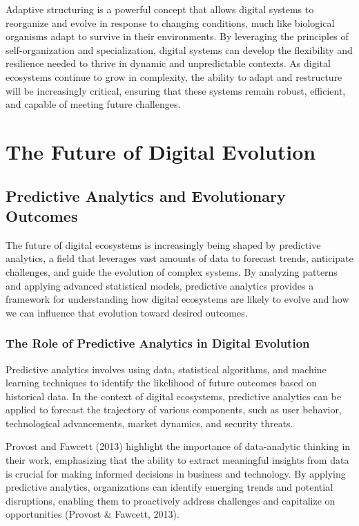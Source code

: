 \documentclass[12pt,twoside]{article}
\begin{document}
Adaptive structuring is a powerful concept that allows digital systems to reorganize and evolve in response to changing conditions, much like biological organisms adapt to survive in their environments. By leveraging the principles of self-organization and specialization, digital systems can develop the flexibility and resilience needed to thrive in dynamic and unpredictable contexts. As digital ecosystems continue to grow in complexity, the ability to adapt and restructure will be increasingly critical, ensuring that these systems remain robust, efficient, and capable of meeting future challenges.


\section{The Future of Digital Evolution}
\subsection{Predictive Analytics and Evolutionary Outcomes}
The future of digital ecosystems is increasingly being shaped by predictive analytics, a field that leverages vast amounts of data to forecast trends, anticipate challenges, and guide the evolution of complex systems. By analyzing patterns and applying advanced statistical models, predictive analytics provides a framework for understanding how digital ecosystems are likely to evolve and how we can influence that evolution toward desired outcomes.

\subsubsection{The Role of Predictive Analytics in Digital Evolution}

Predictive analytics involves using data, statistical algorithms, and machine learning techniques to identify the likelihood of future outcomes based on historical data. In the context of digital ecosystems, predictive analytics can be applied to forecast the trajectory of various components, such as user behavior, technological advancements, market dynamics, and security threats.

Provost and Fawcett (2013) highlight the importance of data-analytic thinking in their work, emphasizing that the ability to extract meaningful insights from data is crucial for making informed decisions in business and technology. By applying predictive analytics, organizations can identify emerging trends and potential disruptions, enabling them to proactively address challenges and capitalize on opportunities (Provost & Fawcett, 2013).
\end{document}

